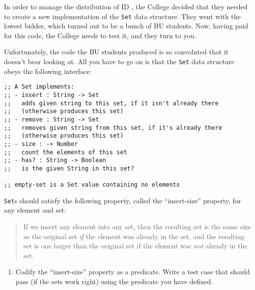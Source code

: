 \documentclass[12pt]{article}                   %
\def\pts#1{\marginpar{\footnotesize \raggedright  \fbox{#1 {\sc Points}}}}
\begin{document}
\vfill\thispagestyle{empty}
\newpage



\begin{problem} \pts{15}


In order to manage the distribution of ID , the College decided that they
needed to create a new implementation of the \verb|Set| data
structure.  They went with the lowest bidder, which
turned out to be a bunch of BU students.  Now, having paid for this
code, the College needs to test it, and they turn to you.  

Unfortunately, the code the BU students produced is so convoluted that
it doesn't bear looking at.  All you have to go on is that the
\verb|Set| data structure obeys the following interface:

\begin{verbatim}
;; A Set implements:
;; - insert : String -> Set
;;   adds given string to this set, if it isn't already there
;;   (otherwise produces this set)
;; - remove : String -> Set
;;   removes given string from this set, if it's already there
;;   (otherwise produces this set)
;; - size : -> Number
;;   count the elements of this set
;; - has? : String -> Boolean
;;   is the given String in this set?

;; empty-set is a Set value containing no elements
\end{verbatim}
\noindent
\verb|Set|s should satisfy the following property, called the
``insert-size'' property, for any element and
set:

\begin{quote}
If we insert any element into any set, then the resulting set is the
same size as the original set \emph{if} the element was already in the
set, and the resulting set is one larger than the original set
if the element was \emph{not} already in the set.
\end{quote}

\begin{enumerate}
\item Codify the ``insert-size'' property as a predicate.  Write a
  test case that should pass (if the sets work right) using the
  predicate you have defined.
\end{enumerate}

\ifrubric\else
{}
\fi


\end{problem}
\end{document}
